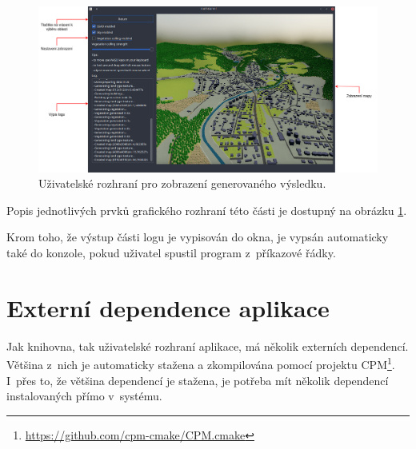 \begin{figure}[H]
	\centering
	\includegraphics[width=39em]{images/impl/renderer-gui.png}
	\caption[caption]{Uživatelské rozhraní pro zobrazení generovaného výsledku.} 
	\label{gui-renderer}
\end{figure}

Popis jednotlivých prvků grafického rozhraní této části je dostupný na obrázku \ref{gui-renderer}.

Krom toho, že výstup části logu je vypisován do okna, je vypsán automaticky také do konzole, pokud uživatel spustil program z~příkazové řádky.

\section{Externí dependence aplikace}
Jak knihovna, tak uživatelské rozhraní aplikace, má několik externích dependencí. Většina z~nich je automaticky stažena a zkompilována pomocí projektu CPM\footnote{\href{https://github.com/cpm-cmake/CPM.cmake}{https://github.com/cpm-cmake/CPM.cmake}}. I~přes to, že většina dependencí je stažena, je potřeba mít několik dependencí instalovaných přímo v~systému.

